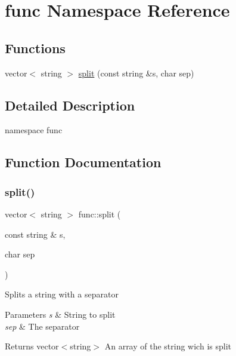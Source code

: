 \hypertarget{namespacefunc}{}\section{func Namespace Reference}
\label{namespacefunc}
\subsection*{Functions}
\begin{DoxyCompactItemize}
\item 
vector$<$ string $>$ \hyperlink{namespacefunc_a9f72ec6e5c1c3620723c349a075d2298}{split} (const string \&s, char sep)
\end{DoxyCompactItemize}


\subsection{Detailed Description}
namespace func 

\subsection{Function Documentation}
\hypertarget{namespacefunc_a9f72ec6e5c1c3620723c349a075d2298}{}\label{namespacefunc_a9f72ec6e5c1c3620723c349a075d2298} 
\subsubsection{\texorpdfstring{split()}{split()}}
{\footnotesize\ttfamily vector$<$ string $>$ func\+::split (\begin{DoxyParamCaption}\item[{const string \&}]{s,  }\item[{char}]{sep }\end{DoxyParamCaption})}

Splits a string with a separator 
\begin{DoxyParams}{Parameters}
{\em s} & String to split \\
\hline
{\em sep} & The separator \\
\hline
\end{DoxyParams}
\begin{DoxyReturn}{Returns}
vector$<$string$>$ An array of the string wich is split 
\end{DoxyReturn}
